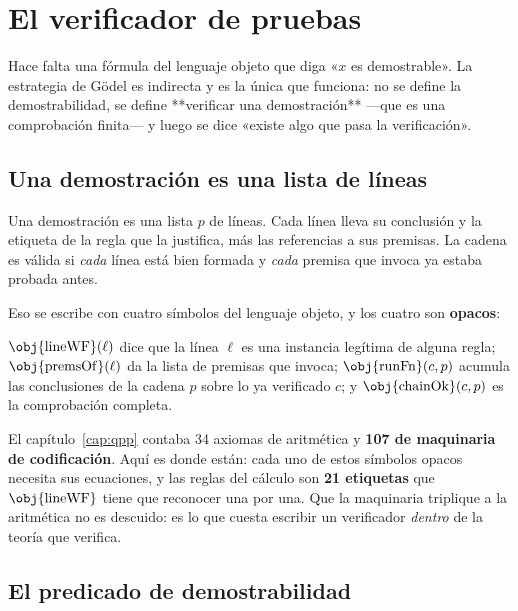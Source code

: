 \chapter{El verificador de pruebas}
\label{cap:verificador}

Hace falta una fórmula del lenguaje objeto que diga «\(x\) es demostrable». La estrategia de Gödel
es indirecta y es la única que funciona: no se define la demostrabilidad, se define **verificar una
demostración** —que es una comprobación finita— y luego se dice «existe algo que pasa la
verificación».

\section{Una demostración es una lista de líneas}

\begin{matematica}
Una demostración es una lista \(p\) de líneas. Cada línea lleva su conclusión y la etiqueta de la
regla que la justifica, más las referencias a sus premisas. La cadena es válida si \emph{cada} línea
está bien formada y \emph{cada} premisa que invoca ya estaba probada antes.
\end{matematica}

Eso se escribe con cuatro símbolos del lenguaje objeto, y los cuatro son \textbf{opacos}:


\noindent \(\obj{\mathrm{lineWF}}(\ell)\) dice que la línea \(\ell\) es una instancia legítima de
alguna regla; \(\obj{\mathrm{premsOf}}(\ell)\) da la lista de premisas que invoca;
\(\obj{\mathrm{runFn}}(c,p)\) acumula las conclusiones de la cadena \(p\) sobre lo ya verificado
\(c\); y \(\obj{\mathrm{chainOk}}(c,p)\) es la comprobación completa.

\begin{leccion}
El capítulo~\ref{cap:qpp} contaba 34 axiomas de aritmética y \textbf{107 de maquinaria de
codificación}. Aquí es donde están: cada uno de estos símbolos opacos necesita sus ecuaciones, y las
reglas del cálculo son \textbf{21 etiquetas} que \(\obj{\mathrm{lineWF}}\) tiene que reconocer una
por una. Que la maquinaria triplique a la aritmética no es descuido: es lo que cuesta escribir un
verificador \emph{dentro} de la teoría que verifica.
\end{leccion}

\section{El predicado de demostrabilidad}

